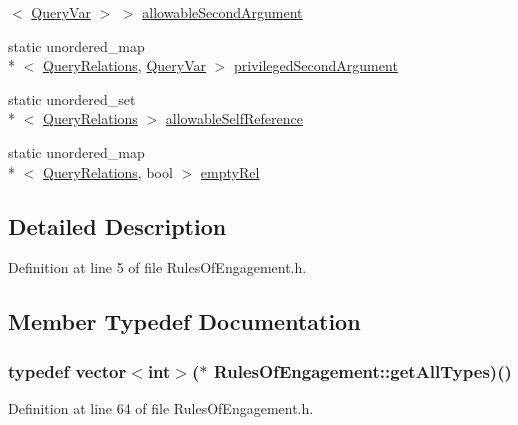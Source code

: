 \begin{DoxyCompactItemize}
$<$ \hyperlink{class_rules_of_engagement_a5dd2b28fd0c906d9b08e29e371713ead}{Query\-Var} $>$ $>$ \hyperlink{class_rules_of_engagement_a365f61557120f33a18021667e746f13e}{allowable\-Second\-Argument}
\item 
static unordered\-\_\-map\\*
$<$ \hyperlink{class_rules_of_engagement_a5e08db2a0638b98dbb06ad923a33d817}{Query\-Relations}, \hyperlink{class_rules_of_engagement_a5dd2b28fd0c906d9b08e29e371713ead}{Query\-Var} $>$ \hyperlink{class_rules_of_engagement_acdc0a8ed701246134911b36aac249c6c}{privileged\-Second\-Argument}
\item 
static unordered\-\_\-set\\*
$<$ \hyperlink{class_rules_of_engagement_a5e08db2a0638b98dbb06ad923a33d817}{Query\-Relations} $>$ \hyperlink{class_rules_of_engagement_a8c7c45f1c886563e1a9e62cd0c22866d}{allowable\-Self\-Reference}
\item 
static unordered\-\_\-map\\*
$<$ \hyperlink{class_rules_of_engagement_a5e08db2a0638b98dbb06ad923a33d817}{Query\-Relations}, bool $>$ \hyperlink{class_rules_of_engagement_a343933b8d961a5dfab7a3cdd979820cf}{empty\-Rel}
\end{DoxyCompactItemize}


\subsection{Detailed Description}


Definition at line 5 of file Rules\-Of\-Engagement.\-h.



\subsection{Member Typedef Documentation}
\hypertarget{class_rules_of_engagement_a1a051f48865a7a4d7f07f0a89f16aafe}{
\subsubsection[{get\-All\-Types}]{\setlength{\rightskip}{0pt plus 5cm}typedef vector$<$int$>$($\ast$ Rules\-Of\-Engagement\-::get\-All\-Types)()}}\label{class_rules_of_engagement_a1a051f48865a7a4d7f07f0a89f16aafe}


Definition at line 64 of file Rules\-Of\-Engagement.\-h.

